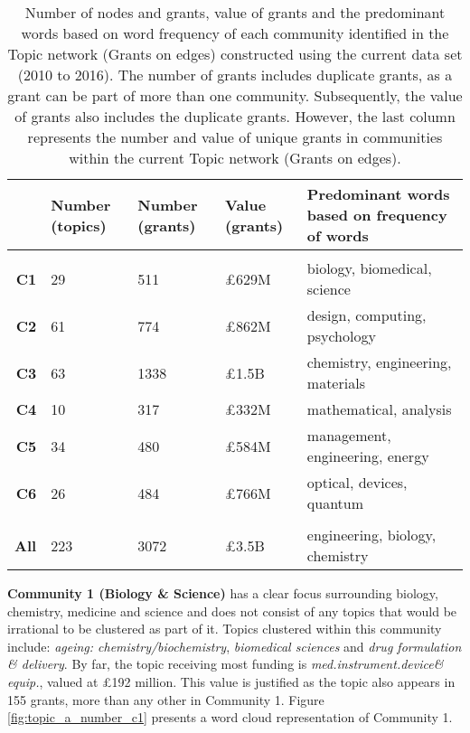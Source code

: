 {\begin{table}[!htbp]
\centering
\caption[Number of nodes and grants, value of grants and the predominant words of each community in the Topic network (Grants on edges) constructed using the current data set (2010 to 2016).]{Number of nodes and grants, value of grants and the predominant words based on word frequency of each community identified in the Topic network (Grants on edges) constructed using the current data set (2010 to 2016). The number of grants includes duplicate grants, as a grant can be part of more than one community. Subsequently, the value of grants also includes the duplicate grants. However, the last column represents the number and value of unique grants in communities within the current Topic network (Grants on edges).}
\label{table:topic_a_current_numbers}
\begin{tabular}{r|>{\raggedleft\arraybackslash}p{1.6cm}>{\raggedleft\arraybackslash}p{1.6cm}>{\raggedleft\arraybackslash}p{1.6cm}>{\raggedleft\arraybackslash}p{6.4cm}}
{} & \textbf{Number (topics)} & \textbf{Number (grants)} & \textbf{Value (grants)} & \textbf{Predominant words based on frequency of words}\\
\hline\\
\textbf{C1}  & {29}  & {511}  & {\pounds629M}  & {biology, biomedical, science}\\
\textbf{C2}  & {61}  & {774}  & {\pounds862M}  & {design, computing, psychology}\\
\textbf{C3}  & {63}  & {1338} & {\pounds1.5B}  & {chemistry, engineering, materials}\\
\textbf{C4}  & {10}  & {317}  & {\pounds332M}  & {mathematical, analysis}\\
\textbf{C5}  & {34}  & {480}  & {\pounds584M}  & {management, engineering, energy}\\
\textbf{C6}  & {26}  & {484}  & {\pounds766M}  & {optical, devices, quantum}\\
\hline\\
\textbf{All} & {223} & {3072} & {\pounds3.5B}  & {engineering, biology, chemistry}\\
\end{tabular}
\end{table}

\noindent\textbf{Community 1 (Biology \& Science)} has a clear focus surrounding biology, chemistry, medicine and science and does not consist of any topics that would be irrational to be clustered as part of it. Topics clustered within this community include: \textit{ageing: chemistry/biochemistry}, \textit{biomedical
sciences} and \textit{drug formulation \& delivery}. By far, the topic receiving most funding is \textit{med.instrument.device\& equip.}, valued at \pounds192 million. This value is justified as the topic also appears in 155 grants, more than any other in Community 1. Figure \ref{fig:topic_a_number_c1} presents a word cloud representation of Community 1.

}
